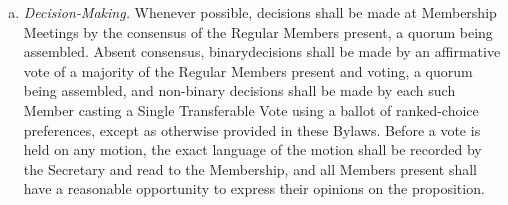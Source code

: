 \begin{enumerate}[a.]
  (50\%) of the total Regular Membership, as determined by the
  Secretary of the Corporation.
\item \emph{Decision-Making.} Whenever possible, decisions shall be made
at Membership Meetings by the consensus of the Regular Members
present, a quorum being assembled. Absent consensus, binarydecisions
shall be made by an affirmative vote of a majority of the Regular
Members present and voting, a quorum being assembled, and non-binary
decisions shall be made by each such Member casting a Single
Transferable Vote using a ballot of ranked-choice preferences, except
as otherwise provided in these Bylaws. Before a vote is held on any
motion, the exact language of the motion shall be recorded by the
Secretary and read to the Membership, and all Members present shall
have a reasonable opportunity to express their opinions on the
proposition.
\end{enumerate}
